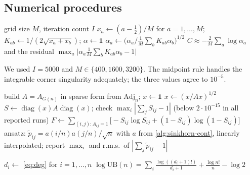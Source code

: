 \subsection{Numerical procedures}

\begin{algorithm}[h]
\caption{The constant $C$}\label{alg:sinkhorn-cont}
\begin{algorithmic}[1]
\Require grid size $M$, iteration count $I$
\State $x_a\gets(a-\frac12)/M$ for $a=1,\dots,M$; $K_{ab}\gets1/(2\sqrt{x_a+x_b})$; $\alpha\gets\mathbf1$
 $\alpha_a\gets\bigl(\alpha_a\big/\tfrac1M\sum_bK_{ab}\alpha_b\bigr)^{1/2}$ \EndFor
\State \Return $C\approx-\frac2M\sum_a\log\alpha_a$ and the residual $\max_a\bigl|\alpha_a\tfrac1M\sum_bK_{ab}\alpha_b-1\bigr|$
\end{algorithmic}
\end{algorithm}
We used $I=5000$ and $M\in\{400,1600,3200\}$. The midpoint rule handles the integrable corner
singularity adequately; the three values agree to $10^{-5}$.

\begin{algorithm}[h]
\caption{Sinkhorn scaling of $A_{G(n)}$, Bethe value, ansatz error}\label{alg:bethe}
\begin{algorithmic}[1]
\State build $A=A_{G(n)}$ in sparse form from $\mathrm{Adj}_n$; $x\gets\mathbf1$
 $x\gets(x/Ax)^{1/2}$ \EndFor
\State $S\gets\operatorname{diag}(x)A\operatorname{diag}(x)$; check $\max_i|\sum_jS_{ij}-1|$ (below $2\cdot10^{-15}$ in all reported runs)
\State $F\gets\sum_{(i,j):A_{ij}=1}\bigl[-S_{ij}\log S_{ij}+(1-S_{ij})\log(1-S_{ij})\bigr]$ 
\State ansatz: $\widetilde p_{ij}=a(i/n)a(j/n)/\sqrt n$ with $a$ from \cref{alg:sinkhorn-cont}, linearly interpolated; report $\max_i$ and r.m.s.\ of $|\sum_j\widetilde p_{ij}-1|$
\end{algorithmic}
\end{algorithm}

\begin{algorithm}[h]
\caption{Finite Bregman bound}\label{alg:bregman}
\begin{algorithmic}[1]
\State $d_i\gets$ \eqref{eq:deg} for $i=1,\dots,n$
\State \Return $\log\mathrm{UB}(n)=\sum_i\frac{\log((d_i+1)!)}{d_i+1}+\frac{\log n!}{n}-\log2$ 
\end{algorithmic}
\end{algorithm}


